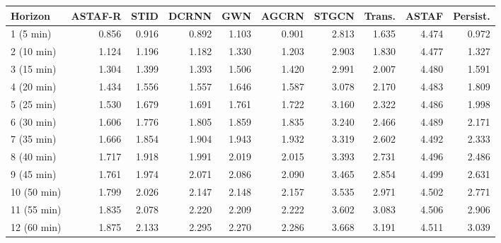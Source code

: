 \begin{tabular}{lrrrrrrrrr}
\toprule
Horizon & ASTAF-R & STID & DCRNN & GWN & AGCRN & STGCN & Trans. & ASTAF & Persist.\\
\midrule
1 (5 min) & 0.856 & 0.916 & 0.892 & 1.103 & 0.901 & 2.813 & 1.635 & 4.474 & 0.972\\
2 (10 min) & 1.124 & 1.196 & 1.182 & 1.330 & 1.203 & 2.903 & 1.830 & 4.477 & 1.327\\
3 (15 min) & 1.304 & 1.399 & 1.393 & 1.506 & 1.420 & 2.991 & 2.007 & 4.480 & 1.591\\
4 (20 min) & 1.434 & 1.556 & 1.557 & 1.646 & 1.587 & 3.078 & 2.170 & 4.483 & 1.809\\
5 (25 min) & 1.530 & 1.679 & 1.691 & 1.761 & 1.722 & 3.160 & 2.322 & 4.486 & 1.998\\
6 (30 min) & 1.606 & 1.776 & 1.805 & 1.859 & 1.835 & 3.240 & 2.466 & 4.489 & 2.171\\
7 (35 min) & 1.666 & 1.854 & 1.904 & 1.943 & 1.932 & 3.319 & 2.602 & 4.492 & 2.333\\
8 (40 min) & 1.717 & 1.918 & 1.991 & 2.019 & 2.015 & 3.393 & 2.731 & 4.496 & 2.486\\
9 (45 min) & 1.761 & 1.974 & 2.071 & 2.086 & 2.090 & 3.465 & 2.854 & 4.499 & 2.631\\
10 (50 min) & 1.799 & 2.026 & 2.147 & 2.148 & 2.157 & 3.535 & 2.971 & 4.502 & 2.771\\
11 (55 min) & 1.835 & 2.078 & 2.220 & 2.209 & 2.222 & 3.602 & 3.083 & 4.506 & 2.906\\
12 (60 min) & 1.875 & 2.133 & 2.295 & 2.270 & 2.286 & 3.668 & 3.191 & 4.511 & 3.039\\
\bottomrule
\end{tabular}
